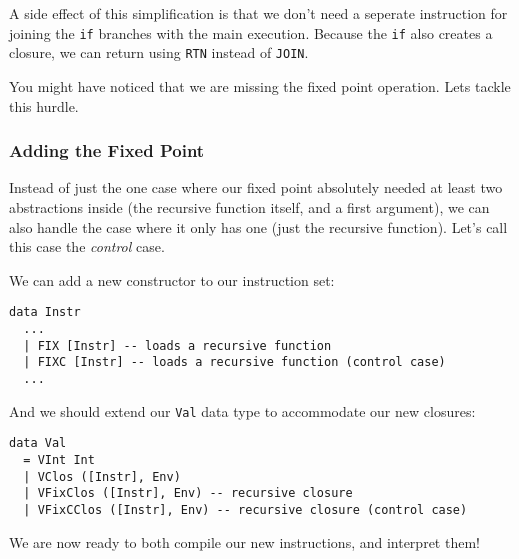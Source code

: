 A side effect of this simplification is that we don't need a seperate instruction for joining the \texttt{if} branches
with the main execution. Because the \texttt{if} also creates a closure, we can return using \texttt{RTN} instead of \texttt{JOIN}.

You might have noticed that we are missing the fixed point operation. Lets tackle this hurdle.

\subsubsection{Adding the Fixed Point}

Instead of just the one case where our fixed point absolutely needed at least two abstractions inside (the recursive function itself, and a first argument), 
we can also handle the case where it only has one (just the recursive function). Let's call this case the \textit{control} case.

We can add a new constructor to our instruction set:
\begin{lstlisting}
data Instr
  ...
  | FIX [Instr] -- loads a recursive function
  | FIXC [Instr] -- loads a recursive function (control case)
  ...
\end{lstlisting}

And we should extend our \texttt{Val} data type to accommodate our new closures:

\begin{lstlisting}
data Val
  = VInt Int
  | VClos ([Instr], Env)
  | VFixClos ([Instr], Env) -- recursive closure
  | VFixCClos ([Instr], Env) -- recursive closure (control case)
\end{lstlisting}

We are now ready to both compile our new instructions, and interpret them!

